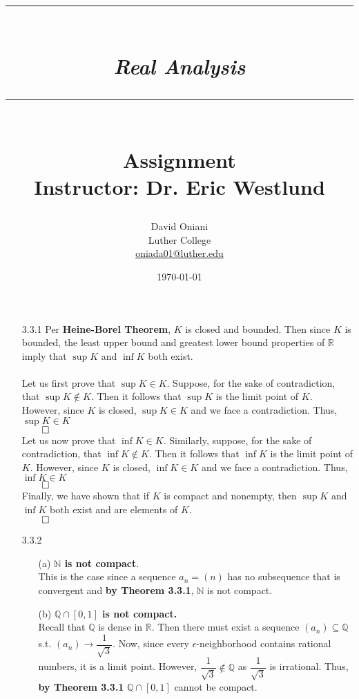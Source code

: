 \documentclass[11pt]{article}
\author{David Oniani\\
        Luther College\\
        \href{mailto:oniada01@luther.edu}{oniada01@luther.edu}}
\title{\rule{\paperwidth - 150pt}{1pt}\textbf{\\\textit{Real Analysis}\\}\rule
{\paperwidth - 150pt}{1pt}\\\textbf{Assignment \textnumero6}\\{\normalsize
Instructor: Dr. Eric Westlund}}
\date{\today}
\newcommand{\nats}{\mathbb{N}}
\newcommand{\reals}{\mathbb{R}}
\newcommand{\rats}{\mathbb{Q}}
\begin{document}
\maketitle

%
%
%
%

\begin{itemize}
    \item[3.3.1]
        Per \textbf{Heine-Borel Theorem}, $K$ is closed and bounded. Then since
        $K$ is bounded, the least upper bound and greatest lower bound
        properties of $\reals$ imply that $\sup{K}$ and $\inf{K}$ both exist.
        \\
        \\
        Let us first prove that $\sup{K} \in K$. Suppose, for the sake of
        contradiction, that $\sup{K} \notin K$. Then it follows that $\sup{K}$
        is the limit point of $K$. However, since $K$ is closed, $\sup{K} \in
        K$ and we face a contradiction. Thus, $\sup{K} \in K$\\
        $\qed$
        \\
        Let us now prove that $\inf{K} \in K$. Similarly, suppose, for the sake
        of contradiction, that $\inf{K} \notin K$. Then it follows that
        $\inf{K}$ is the limit point of $K$. However, since $K$ is closed,
        $\inf{K} \in K$ and we face a contradiction. Thus, $\inf{K} \in K$\\
        $\qed$
        \\
        Finally, we have shown that if $K$ is compact and nonempty, then
        $\sup{K}$ and $\inf{K}$ both exist and are elements of $K$.\\
        $\qed$

    \newpage

    \item[3.3.2]
        \begin{itemize}
            \item[(a)]
                \textbf{$\nats$ is not compact}.
                \\
                This is the case since a sequence $a_n = (n)$ has no
                subsequence that is convergent and \textbf{by Theorem 3.3.1},
                $\nats$ is not compact.

            \item[(b)]
                \textbf{$\rats \cap [0, 1]$ is not compact.}
                \\
                Recall that $\rats$ is dense in $\reals$. Then there must exist
                a sequence $(a_n) \subseteq \rats$ s.t. $(a_n) \to
                \dfrac{1}{\sqrt{3}}$. Now, since every $\epsilon$-neighborhood
                contains rational numbers, it is a limit point. However,
                $\dfrac{1}{\sqrt{3}} \notin \rats$ as $\dfrac{1}{\sqrt{3}}$ is
                irrational. Thus, \textbf{by Theorem 3.3.1} $\rats \cap [0, 1]$
                cannot be compact.


\end{itemize}
\end{itemize}
\end{document}
